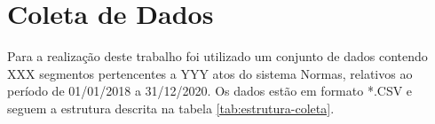 \chapter{Coleta de Dados}

Para a realização deste trabalho foi utilizado um conjunto de dados contendo XXX segmentos pertencentes a YYY atos do sistema Normas, relativos ao período de 01/01/2018 a 31/12/2020. Os dados estão em formato *.CSV e seguem a estrutura descrita na tabela \ref{tab:estrutura-coleta}.

    